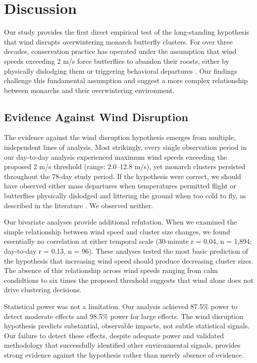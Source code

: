\section{Discussion}

Our study provides the first direct empirical test of the long-standing hypothesis that wind disrupts overwintering monarch butterfly clusters. For over three decades, conservation practice has operated under the assumption that wind speeds exceeding 2 m/s force butterflies to abandon their roosts, either by physically dislodging them or triggering behavioral departures \parencite{leongEvaluatingManagementCalifornia2016}. Our findings challenge this fundamental assumption and suggest a more complex relationship between monarchs and their overwintering environment.

\subsection{Evidence Against Wind Disruption}

The evidence against the wind disruption hypothesis emerges from multiple, independent lines of analysis. Most strikingly, every single observation period in our day-to-day analysis experienced maximum wind speeds exceeding the proposed 2 m/s threshold (range: 2.0--12.8 m/s), yet monarch clusters persisted throughout the 78-day study period. If the hypothesis were correct, we should have observed either mass departures when temperatures permitted flight or butterflies physically dislodged and littering the ground when too cold to fly, as described in the literature \parencite{leongRestorationOverwinteringGrove1999}. We observed neither.

Our bivariate analyses provide additional refutation. When we examined the simple relationship between wind speed and cluster size changes, we found essentially no correlation at either temporal scale (30-minute r = 0.04, n = 1,894; day-to-day r = 0.13, n = 96). These analyses tested the most basic prediction of the hypothesis that increasing wind speed should produce decreasing cluster sizes. The absence of this relationship across wind speeds ranging from calm condidtions to six times the proposed threshold suggests that wind alone does not drive clustering decisions.

Statistical power was not a limitation. Our analysis achieved 87.5\% power to detect moderate effects and 98.5\% power for large effects. The wind disruption hypothesis predicts substantial, observable impacts, not subtle statistical signals. Our failure to detect these effects, despite adequate power and validated methodology that successfully identified other environmental signals, provides strong evidence against the hypothesis rather than merely absence of evidence.

